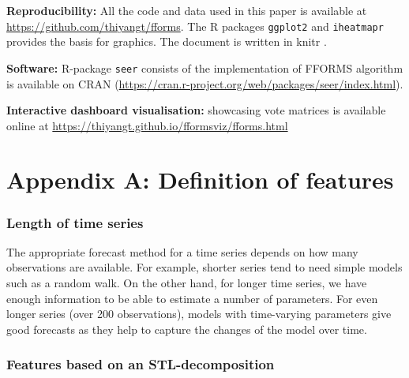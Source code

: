 \documentclass[11pt,a4paper,]{article}
\begin{document}
\textbf{Reproducibility:} All the code and data used in this paper is available at \url{https://github.com/thiyangt/fforms}. The R packages \texttt{ggplot2} \autocite{ggplot} and \texttt{iheatmapr} \autocite{iheatmapr} provides the basis for graphics. The document is written in knitr \autocite{xie2017dynamic}.

\textbf{Software:} R-package \texttt{seer} consists of the implementation of FFORMS algorithm is available on CRAN (\url{https://cran.r-project.org/web/packages/seer/index.html}).

\textbf{Interactive dashboard visualisation:} showcasing vote matrices is available online at \url{https://thiyangt.github.io/fformsviz/fforms.html}

\hypertarget{appendix-a-definition-of-features}{%
\section*{Appendix A: Definition of features}\label{appendix-a-definition-of-features}}

\hypertarget{length-of-time-series}{%
\subsubsection*{Length of time series}\label{length-of-time-series}}

The appropriate forecast method for a time series depends on how many observations are available. For example, shorter series tend to need simple models such as a random walk. On the other hand, for longer time series, we have enough information to be able to estimate a number of parameters. For even longer series (over 200 observations), models with time-varying parameters give good forecasts as they help to capture the changes of the model over time.

\hypertarget{features-based-on-an-stl-decomposition}{%
\subsubsection*{Features based on an STL-decomposition}\label{features-based-on-an-stl-decomposition}}
\end{document}
